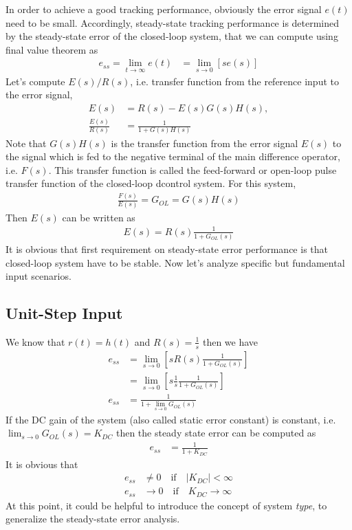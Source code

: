 \documentclass[twoside]{article}
\begin{document}
In order to achieve a good tracking performance, obviously 
the error signal $e(t)$ need to be small. Accordingly, steady-state 
tracking performance is determined by the steady-state error
of the closed-loop system, that we can compute using final
value theorem as
%
\begin{align*}
	e_{ss} = \lim_{t\to \infty} e(t) &= \lim_{s \to 0} \left[ s e(s) \right]
\end{align*}
%
Let's compute $E(s)/R(s)$, i.e. transfer function from the reference input to the 
error signal, 
%
\begin{align*}
E(s) &= R(s) - E(s) G(s) H(s)  , 
\\
\frac{E(s)}{R(s)} &= \frac{1}{1 + G(s) H(s) }
\end{align*}
%
Note that $G(s) H(s)$ is the  transfer function from the error
signal $E(s)$ to the signal which is fed to the negative terminal of 
the main difference operator, i.e. $F(s)$. This transfer function is
called the feed-forward or open-loop  pulse transfer function of the 
closed-loop dcontrol system. For this system, 
%
\begin{align*}
\frac{F(s)}{E(s)} = G_{OL} = G(s) H(s)
\end{align*}
%
Then $E(s)$ can be written as
%
\begin{align*}
E(s) = R(s) \frac{1}{1 + G_{OL} (s) }
\end{align*}
%
It is obvious that first requirement on steady-state error
performance is that closed-loop system have to be stable.
Now let's analyze specific but fundamental input scenarios. 

\subsection*{Unit-Step Input}

We know that $r(t) = h(t)$ and $R(s) = \frac{1}{s}$ then 
we have
%
\begin{align*}
e_{ss} &= \lim_{s \to 0} \left[ s R(s) \frac{1}{1
         + G_{OL} (s) } \right]
\\
&= \lim_{s \to 0} \left[ s \frac{1}{s} \frac{1}{1
         + G_{OL} (s) } \right]
\\
e_{ss} &= \frac{1}{1 + \lim_{s \to 0} G_{OL} (s) }
\end{align*}
%
If the DC gain of the system (also called static error constant) is
constant, i.e. $\lim_{s \to 0}G_{OL}(s) = K_{DC}$ then the steady state error can be
computed as
%
\begin{align*}
e_{ss} &= \frac{1}{1 + K_{DC}}
\end{align*}
%
It is obvious that 
%
\begin{align*}
e_{ss} &\neq 0 \quad \mathrm{if} \quad |K_{DC}| < \infty
\\
e_{ss} &\to 0 \quad \mathrm{if} \quad K_{DC} \to \infty
\end{align*}
%
At this point, it could be helpful to introduce the concept of system \textit{type},
to generalize the steady-state error analysis. 
\end{document}
